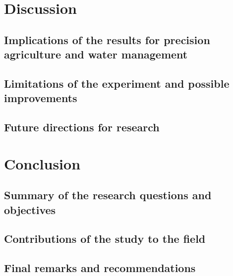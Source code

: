\documentclass[11pt]{scrartcl} %
\begin{document}
\section{Discussion}
\subsection{Implications of the results for precision agriculture and water management}
\subsection{Limitations of the experiment and possible improvements}
\subsection{Future directions for research}
\section{Conclusion}
\subsection{Summary of the research questions and objectives}
\subsection{Contributions of the study to the field}
\subsection{Final remarks and recommendations}


\newpage
\printbibliography[title=References]
\end{document}
